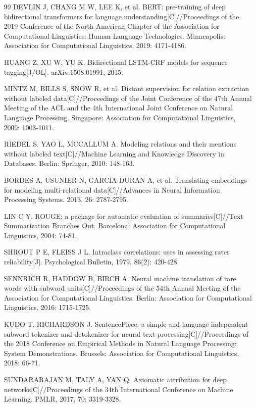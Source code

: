 \documentclass[fontset=fandol,type=master,campus=shenzhen,etitleauto=true]{hithesisbook}
\begin{document}
\begin{thebibliography}{99}
 DEVLIN J, CHANG M W, LEE K, et al. BERT: pre-training of deep bidirectional transformers for language understanding[C]//Proceedings of the 2019 Conference of the North American Chapter of the Association for Computational Linguistics: Human Language Technologies. Minneapolis: Association for Computational Linguistics, 2019: 4171-4186.

 HUANG Z, XU W, YU K. Bidirectional LSTM-CRF models for sequence tagging[J/OL]. arXiv:1508.01991, 2015.

 MINTZ M, BILLS S, SNOW R, et al. Distant supervision for relation extraction without labeled data[C]//Proceedings of the Joint Conference of the 47th Annual Meeting of the ACL and the 4th International Joint Conference on Natural Language Processing. Singapore: Association for Computational Linguistics, 2009: 1003-1011.

 RIEDEL S, YAO L, MCCALLUM A. Modeling relations and their mentions without labeled text[C]//Machine Learning and Knowledge Discovery in Databases. Berlin: Springer, 2010: 148-163.

 BORDES A, USUNIER N, GARCIA-DURAN A, et al. Translating embeddings for modeling multi-relational data[C]//Advances in Neural Information Processing Systems. 2013, 26: 2787-2795.

 LIN C Y. ROUGE: a package for automatic evaluation of summaries[C]//Text Summarization Branches Out. Barcelona: Association for Computational Linguistics, 2004: 74-81.

 SHROUT P E, FLEISS J L. Intraclass correlations: uses in assessing rater reliability[J]. Psychological Bulletin, 1979, 86(2): 420-428.

 SENNRICH R, HADDOW B, BIRCH A. Neural machine translation of rare words with subword units[C]//Proceedings of the 54th Annual Meeting of the Association for Computational Linguistics. Berlin: Association for Computational Linguistics, 2016: 1715-1725.

 KUDO T, RICHARDSON J. SentencePiece: a simple and language independent subword tokenizer and detokenizer for neural text processing[C]//Proceedings of the 2018 Conference on Empirical Methods in Natural Language Processing: System Demonstrations. Brussels: Association for Computational Linguistics, 2018: 66-71.

 SUNDARARAJAN M, TALY A, YAN Q. Axiomatic attribution for deep networks[C]//Proceedings of the 34th International Conference on Machine Learning. PMLR, 2017, 70: 3319-3328.


\end{thebibliography}
\end{document}
